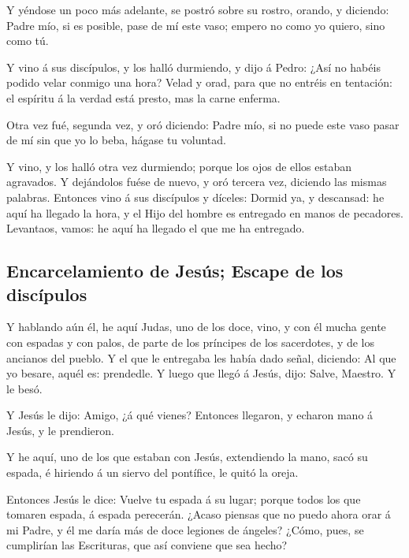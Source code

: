  Y yéndose un poco más adelante, se postró sobre su
rostro, orando, y diciendo: Padre mío, si es posible, pase de mí este
vaso; empero no como yo quiero, sino como tú.

 Y vino á sus discípulos, y los halló durmiendo, y dijo á
Pedro: ¿Así no habéis podido velar conmigo una hora? 
Velad y orad, para que no entréis en tentación: el espíritu á la verdad
está presto, mas la carne enferma.

 Otra vez fué, segunda vez, y oró diciendo: Padre mío, si
no puede este vaso pasar de mí sin que yo lo beba, hágase tu voluntad.

 Y vino, y los halló otra vez durmiendo; porque los ojos
de ellos estaban agravados.  Y dejándolos fuése de nuevo,
y oró tercera vez, diciendo las mismas palabras. 
Entonces vino á sus discípulos y díceles: Dormid ya, y descansad: he
aquí ha llegado la hora, y el Hijo del hombre es entregado en manos de
pecadores.  Levantaos, vamos: he aquí ha llegado el que
me ha entregado.

\hypertarget{encarcelamiento-de-jesuxfas-escape-de-los-discuxedpulos}{%
\subsection{Encarcelamiento de Jesús; Escape de los
discípulos}\label{encarcelamiento-de-jesuxfas-escape-de-los-discuxedpulos}}

 Y hablando aún él, he aquí Judas, uno de los doce, vino,
y con él mucha gente con espadas y con palos, de parte de los príncipes
de los sacerdotes, y de los ancianos del pueblo.  Y el
que le entregaba les había dado señal, diciendo: Al que yo besare, aquél
es: prendedle.  Y luego que llegó á Jesús, dijo: Salve,
Maestro. Y le besó.

 Y Jesús le dijo: Amigo, ¿á qué vienes? Entonces
llegaron, y echaron mano á Jesús, y le prendieron.

 Y he aquí, uno de los que estaban con Jesús, extendiendo
la mano, sacó su espada, é hiriendo á un siervo del pontífice, le quitó
la oreja.

 Entonces Jesús le dice: Vuelve tu espada á su lugar;
porque todos los que tomaren espada, á espada perecerán. 
¿Acaso piensas que no puedo ahora orar á mi Padre, y él me daría más de
doce legiones de ángeles?  ¿Cómo, pues, se cumplirían las
Escrituras, que así conviene que sea hecho?

